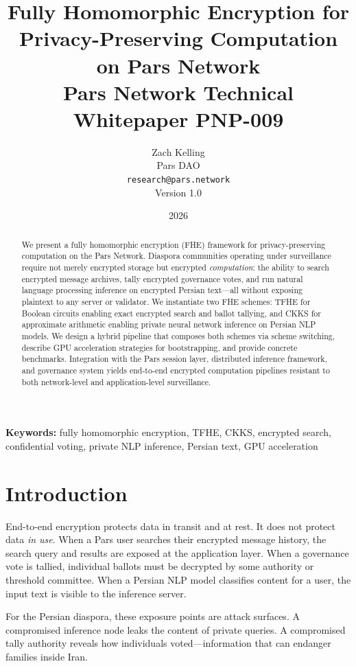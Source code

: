\documentclass[11pt,a4paper]{article}
\title{%
    \textbf{Fully Homomorphic Encryption for\\
    Privacy-Preserving Computation on Pars Network}\\[0.5em]
    \large Pars Network Technical Whitepaper PNP-009
}
\author{%
    Zach Kelling\\
    Pars DAO\\
    \texttt{research@pars.network}\\[0.5em]
    \small Version 1.0
}
\date{2026}
\begin{document}
\parscoverpage

\thispagestyle{fancy}

\begin{abstract}
\noindent
We present a fully homomorphic encryption (FHE) framework for
privacy-preserving computation on the Pars Network.  Diaspora communities
operating under surveillance require not merely encrypted storage but
encrypted \emph{computation}: the ability to search encrypted message
archives, tally encrypted governance votes, and run natural language
processing inference on encrypted Persian text---all without exposing
plaintext to any server or validator.  We instantiate two FHE schemes:
TFHE for Boolean circuits enabling exact encrypted search and ballot
tallying, and CKKS for approximate arithmetic enabling private neural
network inference on Persian NLP models.  We design a hybrid pipeline
that composes both schemes via scheme switching, describe GPU acceleration
strategies for bootstrapping, and provide concrete benchmarks.  Integration
with the Pars session layer, distributed inference framework, and
governance system yields end-to-end encrypted computation pipelines
resistant to both network-level and application-level surveillance.
\end{abstract}

\vspace{1em}
\noindent\textbf{Keywords:} fully homomorphic encryption, TFHE, CKKS,
encrypted search, confidential voting, private NLP inference, Persian text,
GPU acceleration

\tableofcontents
\newpage

\section{Introduction}
\label{sec:intro}

End-to-end encryption protects data in transit and at rest.  It does not
protect data \emph{in use}.  When a Pars user searches their encrypted
message history, the search query and results are exposed at the
application layer.  When a governance vote is tallied, individual ballots
must be decrypted by some authority or threshold committee.  When a Persian
NLP model classifies content for a user, the input text is visible to the
inference server.

For the Persian diaspora, these exposure points are attack surfaces.  A
compromised inference node leaks the content of private queries.  A
compromised tally authority reveals how individuals voted---information
that can endanger families inside Iran.
\end{document}
